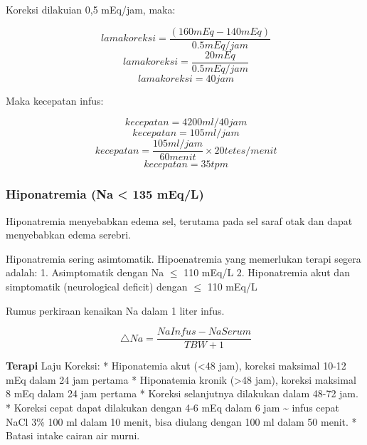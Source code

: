 \documentclass[
]{book}
\begin{document}
Koreksi dilakuian 0,5 mEq/jam, maka:

\begin{equation}
\ lama koreksi = \frac{(160 mEq - 140 mEq)}{0.5 mEq/jam}
\end{equation}
\begin{equation}
\ lama koreksi = \frac{20 mEq}{0.5 mEq/jam}
\end{equation}
\begin{equation}
\ lama koreksi = 40 jam
\end{equation}

Maka kecepatan infus:

\begin{equation}
\ kecepatan = 4200 ml/40 jam
\end{equation}
\begin{equation}
\ kecepatan = 105 ml/jam
\end{equation}
\begin{equation}
\ kecepatan = \frac{ 105 ml/jam}{60 menit} \times 20 tetes/menit 
\end{equation}
\begin{equation}
\ kecepatan = 35 tpm
\end{equation}

\hypertarget{hiponatremia-na-135-meql}{%
\subsubsection{Hiponatremia (Na \textless{} 135 mEq/L)}\label{hiponatremia-na-135-meql}}

Hiponatremia menyebabkan edema sel, terutama pada sel saraf otak dan dapat menyebabkan edema serebri.

Hiponatremia sering asimtomatik. Hipoenatremia yang memerlukan terapi segera adalah:
1. Asimptomatik dengan Na \(\leq\) 110 mEq/L
2. Hiponatremia akut dan simptomatik (neurological deficit) dengan \(\leq\) 110 mEq/L

Rumus perkiraan kenaikan Na dalam 1 liter infus.

\begin{equation}
\ \triangle Na = \frac{Na Infus - Na Serum}{TBW + 1}
\end{equation}

\textbf{Terapi}
Laju Koreksi:
* Hiponatemia akut (\textless48 jam), koreksi maksimal 10-12 mEq dalam 24 jam pertama
* Hiponatemia kronik (\textgreater48 jam), koreksi maksimal 8 mEq dalam 24 jam pertama
* Koreksi selanjutnya dilakukan dalam 48-72 jam.
* Koreksi cepat dapat dilakukan dengan 4-6 mEq dalam 6 jam \textasciitilde{} infus cepat NaCl 3\% 100 ml dalam 10 menit, bisa diulang dengan 100 ml dalam 50 menit.
* Batasi intake cairan air murni.
\end{document}
